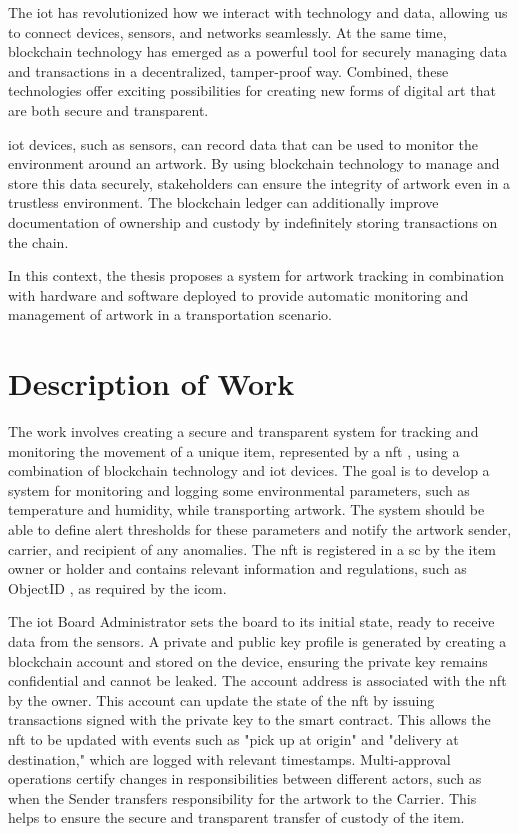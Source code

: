 The \gls{iot} has revolutionized how we interact with technology and data, allowing us to connect devices, sensors, and networks seamlessly. At the same time, blockchain technology has emerged as a powerful tool for securely managing data and transactions in a decentralized, tamper-proof way. Combined, these technologies offer exciting possibilities for creating new forms of digital art that are both secure and transparent.

\gls{iot} devices, such as sensors, can record data that can be used to monitor the environment around an artwork. By using blockchain technology to manage and store this data securely, stakeholders can ensure the integrity of artwork even in a trustless environment. The blockchain ledger can additionally improve documentation of ownership and custody by indefinitely storing transactions on the chain.

In this context, the thesis proposes a system for artwork tracking in combination with hardware and software deployed to provide automatic monitoring and management of artwork in a transportation scenario.

\section{Description of Work}
The work involves creating a secure and transparent system for tracking and monitoring the movement of a unique item, represented by a \gls{nft} \cite{nftminter}, using a combination of blockchain technology and \gls{iot} devices. The goal is to develop a system for monitoring and logging some environmental parameters, such as temperature and humidity, while transporting artwork. The system should be able to define alert thresholds for these parameters and notify the artwork sender, carrier, and recipient of any anomalies. The \gls{nft} is registered in a \gls{sc} by the item owner or holder and contains relevant information and regulations, such as ObjectID \cite{objectid}, as required by the \gls{icom}.

The \gls{iot} Board Administrator sets the board to its initial state, ready to receive data from the sensors. A private and public key profile is generated by creating a blockchain account and stored on the device, ensuring the private key remains confidential and cannot be leaked. The account address is associated with the \gls{nft} by the owner. This account can update the state of the \gls{nft} by issuing transactions signed with the private key to the smart contract. This allows the \gls{nft} to be updated with events such as "pick up at origin" and "delivery at destination," which are logged with relevant timestamps. Multi-approval operations certify changes in responsibilities between different actors, such as when the Sender transfers responsibility for the artwork to the Carrier. This helps to ensure the secure and transparent transfer of custody of the item. 

